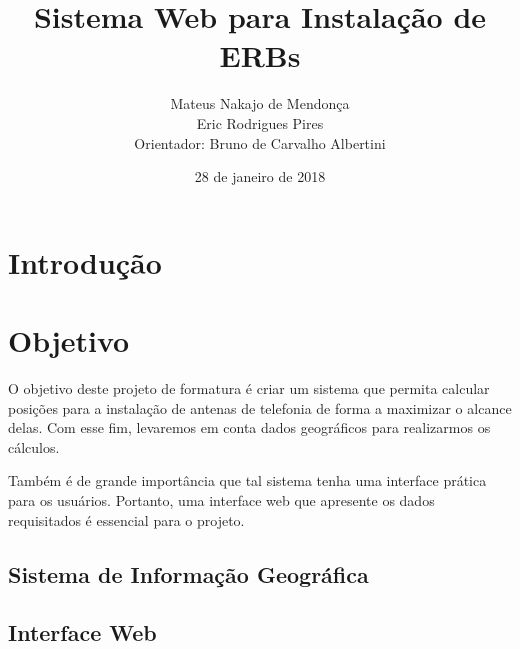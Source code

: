 \documentclass[12pt,a4paper]{article}
\title{Sistema Web para Instalação de ERBs}
\author{Mateus Nakajo de Mendonça  \\
	Eric Rodrigues Pires  \\
    Orientador: Bruno de Carvalho Albertini
	}
\date{28 de janeiro de 2018}
\begin{document}
\maketitle

\begin{abstract}

\lipsum[1]

\end{abstract}

\section{Introdução}

\lipsum[2-3]

\section{Objetivo}

O objetivo deste projeto de formatura é criar um sistema que permita calcular
posições para a instalação de antenas de telefonia de forma a maximizar o
alcance delas. Com esse fim, levaremos em conta dados geográficos para
realizarmos os cálculos.

Também é de grande importância que tal sistema tenha uma interface prática
para os usuários. Portanto, uma interface web que apresente os dados
requisitados é essencial para o projeto.

\subsection{Sistema de Informação Geográfica}

\lipsum[4-5]


\subsection{Interface Web}

\lipsum[6-7]

\end{document}
